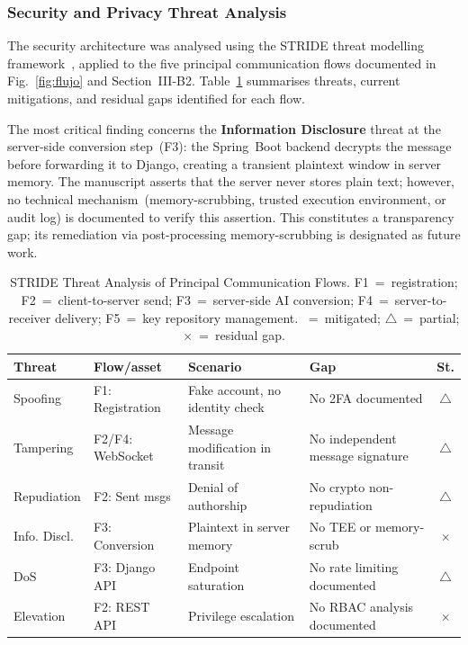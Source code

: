 \documentclass[journal]{IEEEtran}
\begin{document}
	\subsubsection{Security and Privacy Threat Analysis}
	\label{sec:stride}
	The security architecture was analysed using the STRIDE threat
	modelling framework~\cite{shostack2014}, applied to the five
	principal communication flows documented in Fig.~\ref{fig:flujo}
	and Section~III-B2.
	Table~\ref{tab:stride} summarises threats, current mitigations,
	and residual gaps identified for each flow.
	
	The most critical finding concerns the \textbf{Information Disclosure}
	threat at the server-side conversion step~(F3): the Spring~Boot
	backend decrypts the message before forwarding it to Django,
	creating a transient plaintext window in server memory.
	The manuscript asserts that the server never stores plain text;
	however, no technical mechanism~(memory-scrubbing, trusted
	execution environment, or audit log) is documented to verify
	this assertion.
	This constitutes a transparency gap; its remediation via
	post-processing memory-scrubbing is designated as future work.
	
	\begin{table}[!t]
		\caption{STRIDE Threat Analysis of Principal Communication Flows.
			F1~=~registration; F2~=~client-to-server send;
			F3~=~server-side AI conversion; F4~=~server-to-receiver delivery;
			F5~=~key repository management.
			\checkmark~=~mitigated; $\triangle$~=~partial; $\times$~=~residual gap.}
		\label{tab:stride}
		\centering
		\scriptsize
		\renewcommand{\arraystretch}{1.25}
		\begin{tabular}{p{0.9cm}p{1.4cm}p{2.1cm}p{1.5cm}c}
			\toprule
			\textbf{Threat} & \textbf{Flow/asset} & \textbf{Scenario} & \textbf{Gap} & \textbf{St.} \\
			\midrule
			Spoofing & F1: Registration & Fake account, no identity check & No 2FA documented & $\triangle$ \\
			Tampering & F2/F4: WebSocket & Message modification in transit & No independent message signature & $\triangle$ \\
			Repudiation & F2: Sent msgs & Denial of authorship & No crypto non-repudiation & $\triangle$ \\
			Info. Discl. & F3: Conversion & Plaintext in server memory & No TEE or memory-scrub & $\times$ \\
			DoS & F3: Django API & Endpoint saturation & No rate limiting documented & $\triangle$ \\
			Elevation & F2: REST API & Privilege escalation & No RBAC analysis documented & $\times$ \\
			\bottomrule
		\end{tabular}
	\end{table}
	
\end{document}
